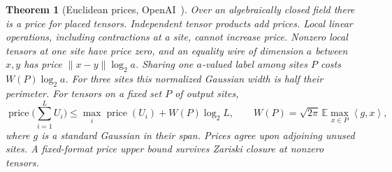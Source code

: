 \documentclass[11pt]{article}
\newtheorem{theorem}{Theorem}[section]
\theoremstyle{definition}
\newcommand{\angles}[1]{\left\langle #1\right\rangle}
\begin{document}
\begin{theorem}[Euclidean prices, OpenAI~\cite{euclid}]\label{thm:price}
Over an algebraically closed field there is a price for placed tensors. Independent tensor products add prices. Local linear operations, including contractions at a site, cannot increase price. Nonzero local tensors at one site have price zero, and an equality wire of dimension \(a\) between \(x,y\) has price \(\|x-y\|\log_2 a\). Sharing one \(a\)-valued label among sites \(P\) costs \(W(P)\log_2 a\). For three sites this normalized Gaussian width is half their perimeter. For tensors on a fixed set \(P\) of output sites,
\[
  \operatorname{price}\Big(\sum_{i=1}^L U_i\Big)
       \le \max_i\operatorname{price}(U_i)+W(P)\log_2 L,\qquad
  W(P)=\sqrt{2\pi}\,\mathbb E\max_{x\in P}\angles{g,x},
\]
where \(g\) is a standard Gaussian in their span. Prices agree upon adjoining unused sites. A fixed-format price upper bound survives Zariski closure at nonzero tensors.
\end{theorem}
\end{document}

